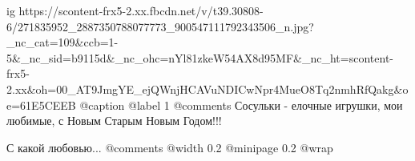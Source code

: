  
 
 
 
 

\ifcmt
  ig https://scontent-frx5-2.xx.fbcdn.net/v/t39.30808-6/271835952_2887350788077773_900547111792343506_n.jpg?_nc_cat=109&ccb=1-5&_nc_sid=b9115d&_nc_ohc=nYl81zkeW54AX8d95MF&_nc_ht=scontent-frx5-2.xx&oh=00_AT9JmgYE_ejQWnjHCAVuNDICwNpr4MueO8Tq2nmhRfQakg&oe=61E5CEEB
  @caption @label 1
	@comments%
Сосульки - елочные игрушки, мои любимые, с Новым Старым Новым Годом!!!

С какой любовью... 
	@comments%
  @width 0.2
  @minipage 0.2
  @wrap \parpic[r]
\fi
